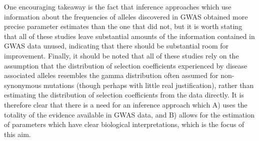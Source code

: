 \documentclass[11pt]{article}
\newcommand{\jb}[1]{{\color{blue} (#1)} }
\begin{document}
One encouraging takeaway is the fact that inference approaches which use information about the frequencies of alleles discovered in GWAS\cite{Mancuso:2015cp, Fuchsberger:2016df} obtained more precise parameter estimates than the one that did not\cite{Agarwala:2013bu}, but it is worth stating that all of these studies leave substantial amounts of the information contained in GWAS data unused, indicating that there should be substantial room for improvement. Finally, it should be noted that all of these studies rely on the assumption that the distribution of selection coefficients experienced by disease associated alleles resembles the gamma distribution often assumed for non-synonymous mutations\cite{EyreWalker:2007dl} (though perhaps with little real justification\cite{Racimo:2014cb}), rather than estimating the distribution of selection coefficients from the data directly. It is therefore clear that there is a need for an inference approach which A) uses the totality of the evidence available in GWAS data, and B) allows for the estimation of parameters which have clear biological interpretations, which is the focus of this aim.


\end{document}
